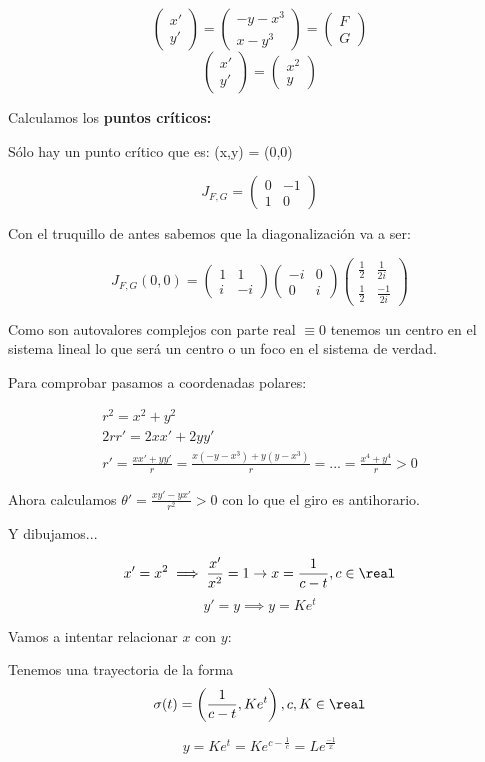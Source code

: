 \documentclass[nochap]{apuntes}
\begin{document}
\begin{problem}[3]
\ppart
\[\begin{pmatrix}
x'\\y'
\end{pmatrix} = \begin{pmatrix}
-y-x^3\\x-y^3
\end{pmatrix} = \begin{pmatrix}
F\\G
\end{pmatrix}\]
\ppart
\[\begin{pmatrix}
x'\\y'
\end{pmatrix} = \begin{pmatrix}
x^2\\y
\end{pmatrix}\]
\solution

Calculamos los \textbf{puntos críticos:} 

Sólo hay un punto crítico que es: (x,y) = (0,0)

\[J_{F,G} = \begin{pmatrix}
0&-1\\1&0
\end{pmatrix}\]

Con el truquillo de antes sabemos que la diagonalización va a ser:

\[J_{F,G}(0,0) = \begin{pmatrix}
1&1\\i&-i
\end{pmatrix} \begin{pmatrix}
-i&0\\0&i
\end{pmatrix} \begin{pmatrix}
\frac{1}{2}&\frac{1}{2i}\\
\frac{1}{2}&\frac{-1}{2i}
\end{pmatrix}\]

Como son autovalores complejos con parte real $\equiv 0$ tenemos un centro en el sistema lineal lo que será un centro o un foco en el sistema de verdad.

Para comprobar pasamos a coordenadas polares:

\begin{gather*}
r^2=x^2+y^2\\
2rr' = 2xx'+2yy'\\
r' = \frac{xx'+yy'}{r} = \frac{x(-y-x^3) + y(y-x^3)}{r} = ... = \frac{x^4+y^4}{r} > 0
\end{gather*}

Ahora calculamos $\theta' = \frac{xy'-yx'}{r^2} > 0$ con lo que el giro es antihorario.

Y dibujamos...


\spart
\[x'=x^2 \implies \frac{x'}{x^2} = 1 \to x = \frac{1}{c-t},c\in\real\]
\[y'=y \implies y = Ke^t\]

Vamos a intentar relacionar $x$ con $y$:


Tenemos  una trayectoria de la forma \[\sigma(t) = \left(\frac{1}{c-t},Ke^t\right),c,K\in\real\]

\[y = Ke^t = Ke^{c-\frac{1}{c}} = Le^{\frac{-1}{x}}\]

\end{problem}
\end{document}
